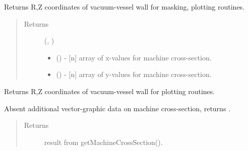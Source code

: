 \documentclass[letterpaper,10pt,english]{sphinxmanual}
\begin{document}
\begin{fulllineitems}
\begin{fulllineitems}
\end{fulllineitems}


\begin{fulllineitems}
\label{\detokenize{eqtools:eqtools.AUGData.AUGDDData.getMachineCrossSection}}
Returns R,Z coordinates of vacuum-vessel wall for masking, plotting
routines.
\begin{quote}\begin{description}
\item[{Returns}] \leavevmode

(, )
\begin{itemize}
\item {} 
 () - {[}n{]} array of x-values for machine cross-section.

\item {} 
 () - {[}n{]} array of y-values for machine cross-section.

\end{itemize}


\end{description}\end{quote}

\end{fulllineitems}


\begin{fulllineitems}
\label{\detokenize{eqtools:eqtools.AUGData.AUGDDData.getMachineCrossSectionFull}}
Returns R,Z coordinates of vacuum-vessel wall for plotting routines.

Absent additional vector-graphic data on machine cross-section, returns
{\hyperref[\detokenize{eqtools:eqtools.AUGData.AUGDDData.getMachineCrossSection}]{}}.
\begin{quote}\begin{description}
\item[{Returns}] \leavevmode
result from getMachineCrossSection().


\end{description}
\end{quote}
\end{fulllineitems}
\end{fulllineitems}
\end{document}
